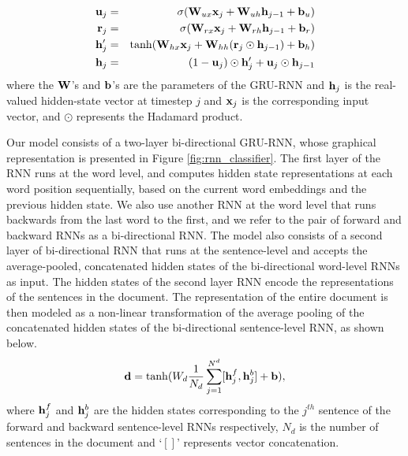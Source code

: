 \documentclass[letterpaper]{article}
\begin{document}
\begin{eqnarray}
{\bf u}_j &=&  \sigma({\bf W}_{ux}{\bf x}_j + {\bf W}_{uh} {\bf h}_{j-1} + {\bf b}_u) \label{eq:update_gate}\\
{\bf r}_j &=&  \sigma({\bf W}_{rx}{\bf x}_j + {\bf W}_{rh} {\bf h}_{j-1} + {\bf b}_r) \label{eq:reset_gate}\\
{\bf h}'_j &=& \tanh({\bf W}_{hx}{\bf x}_j + {\bf W}_{hh} ({\bf r}_j \odot {\bf h}_{j-1}) + {\bf b}_h) \label{eq:hidden_state}\\
{\bf h}_j &=& (1-{\bf u}_j)\odot {\bf h}'_j + {\bf u}_j \odot {\bf h}_{j-1}
\end{eqnarray}
where the ${\bf W}$'s and ${\bf b}$'s are the parameters of the GRU-RNN and ${\bf h}_j$ is the real-valued hidden-state vector at timestep $j$ and ${\bf x}_j$ is the corresponding input vector, and $\odot$ represents the Hadamard product.

Our model consists of a two-layer bi-directional GRU-RNN, whose graphical representation is presented in Figure \ref{fig:rnn_classifier}. 
The first layer of the RNN runs at the word level, and computes hidden state representations at each word position sequentially, based on the current word embeddings and the previous hidden state. We also use another RNN at the word level that runs backwards from the last word to the first, and we refer to the pair of forward and backward RNNs as a bi-directional RNN. The model also consists of a second layer of bi-directional RNN that runs at the sentence-level and accepts the average-pooled, concatenated hidden states of the bi-directional word-level RNNs as input. The hidden states of the second layer RNN encode the representations of the sentences in the document. The representation of the entire document is then modeled as a non-linear transformation of the average pooling of the concatenated hidden states of the  bi-directional sentence-level RNN, as shown below.
\begin{equation}
{\bf d} = \tanh(W_d\frac{1}{N_d}\sum_{j=1}^{N^d} [{\bf h}^{f}_j, {\bf h}^{b}_j] + {\bf b}),
\end{equation}
where ${\bf h}^f_j$ and ${\bf h}^b_j$ are the hidden states corresponding to the $j^{th}$ sentence of the forward and backward sentence-level RNNs respectively, $N_d$ is the number of sentences in the document and `$[ ]$' represents vector concatenation. 
\end{document}
